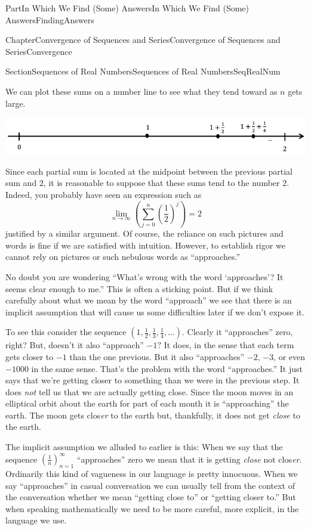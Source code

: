 \documentclass[oneside,10pt,]{book}
\numberwithin{equation}{part}
\def\limit#1#2#3{{\displaystyle\lim_{#1\rightarrow #2}#3}}
\begin{document}
\begin{partptx}{Part}{In Which We Find (Some) Answers}{}{In Which We Find (Some) Answers}{}{}{FindingAnswers}
\begin{chapterptx}{Chapter}{Convergence of Sequences and Series}{}{Convergence of Sequences and Series}{}{}{Convergence}
\begin{sectionptx}{Section}{Sequences of Real Numbers}{}{Sequences of Real Numbers}{}{}{SeqRealNum}
\begin{equation*}
\end{equation*}
%
\par
We can plot these sums on a number line to see what they tend toward as \(n\) gets large.%
\begin{image}{0.08}{0.84}{0.08}{}%
\includegraphics[width=\linewidth]{external/images/NumberLine.png}
\end{image}%
Since each partial sum is located at the midpoint between the previous partial sum and \(2\), it is reasonable to suppose that these sums tend to the number 2. Indeed, you probably have seen an expression such as%
\begin{equation*}
\limit{n}{\infty}{\left(\sum_{j=0}^n\left(\frac{1}{2}\right)^j\right)}=2
\end{equation*}
justified by a similar argument. Of course, the reliance on such pictures and words is fine if we are satisfied with intuition. However, to establish rigor we cannot rely on pictures or such nebulous words as ``approaches.''%
\par
No doubt you are wondering ``What's wrong with the word `approaches'?  It seems clear enough to me.'' This is often a sticking point.  But if we think carefully about what we mean by the word ``approach'' we see that there is an implicit assumption that will cause us some difficulties later if we don't expose it.%
\par
To see this consider the sequence \(\left(1,\frac12,\frac13,\frac14,\ldots\right)\).  Clearly it ``approaches'' zero, right?  But, doesn't it also ``approach'' \(-1?\) It does, in the sense that each term gets closer to \(-1\) than the one previous.  But it also ``approaches'' \(-2\), \(-3\), or even \(-1000\) in the same sense.  That's the problem with the word ``approaches.'' It just says that we're getting closer to something than we were in the previous step.  It does \emph{not} tell us that we are actually getting close.  Since the moon moves in an elliptical orbit about the earth for part of each month it is ``approaching'' the earth.  The moon gets clos\emph{er} to the earth but, thankfully, it does not get \emph{close} to the earth.%
\par
The implicit assumption we alluded to earlier is this: When we say that the sequence \(\left(\frac1n\right)_{n=1}^\infty\) ``approaches'' zero we mean that it is getting \emph{close} not clos\emph{er}. Ordinarily this kind of vagueness in our language is pretty innocuous.  When we say ``approaches'' in casual conversation we can usually tell from the context of the conversation whether we mean ``getting close to'' or ``getting closer to.'' But when speaking mathematically we need to be more careful, more explicit, in the language we use.%

\end{sectionptx}
\end{chapterptx}
\end{partptx}
\end{document}
